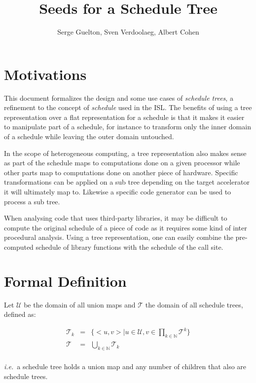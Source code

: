 \documentclass{article}
\title{Seeds for a Schedule Tree} %
\author{Serge Guelton, Sven Verdoolaeg, Albert Cohen}
\begin{document}
\maketitle

\section*{Motivations}

This document formalizes the design and some use cases of \emph{schedule
trees}, a refinement to the concept of \emph{schedule} used in the \ac{ISL}. The
benefits of using a tree representation over a flat representation for a
schedule is that it makes it easier to manipulate part of a schedule, for
instance to transform only the inner domain of a schedule while leaving the
outer domain untouched.

In the scope of heterogeneous computing, a tree representation also makes sense
as part of the schedule maps to computations done on a given processor while
other parts map to computations done on another piece of hardware. Specific
transformations can be applied on a sub tree depending on the target
accelerator it will ultimately map to. Likewise a specific code generator can
be used to process a sub tree.

When analysing code that uses third-party libraries, it may be difficult to
compute the original schedule of a piece of code as it requires some kind of
inter procedural analysis. Using a tree representation, one can easily combine
the pre-computed schedule of library functions with the schedule of the call
site.

\section{Formal Definition}

Let $\mathcal{U}$ be the domain of all union maps and $\mathcal{T}$ the domain
of all schedule trees, defined as:

\[
    \begin{array}{lcl}
        \mathcal{T}_k &=& \{ <u, v> | u \in \mathcal{U}, v \in \displaystyle\prod_{k\in\mathbb{N}}\mathcal{T}^k \} \\
        \mathcal{T} &=& \displaystyle\bigcup_{k\in\mathbb{N}} \mathcal{T}_k\\
    \end{array}
\]

\noindent \emph{i.e.}\ a schedule tree holds a union map and any number of children that also are schedule trees.
\end{document}
